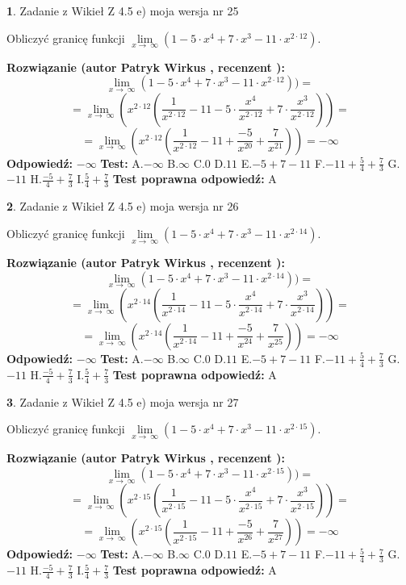 \documentclass[12pt, a4paper]{article}
\theoremstyle{definition} %
\newtheorem{zad}{}
\newcommand{\zadStart}[1]{\begin{zad}#1\newline}
\newcommand{\zadStop}{\end{zad}}
\newcommand{\rozwStart}[2]{\noindent \textbf{Rozwiązanie (autor #1 , recenzent #2): }\newline}
\newcommand{\rozwStop}{\newline}
\newcommand{\odpStart}{\noindent \textbf{Odpowiedź:}\newline}
\newcommand{\odpStop}{\newline}
\newcommand{\testStart}{\noindent \textbf{Test:}\newline}
\newcommand{\testStop}{\newline}
\newcommand{\kluczStart}{\noindent \textbf{Test poprawna odpowiedź:}\newline}
\newcommand{\kluczStop}{\newline}
\begin{document}
\zadStart{Zadanie z Wikieł Z 4.5 e) moja wersja nr 25}



Obliczyć granicę funkcji  $\lim\limits_{x\to\ \infty}(1 - 5 \cdot x^{4}+7 \cdot x^{3}- 11 \cdot x^{2\cdot12})$.
\zadStop
\rozwStart{Patryk Wirkus}{}
$$\lim\limits_{x\to\ \infty}(1 - 5 \cdot x^{4}+7 \cdot x^{3}- 11 \cdot x^{2\cdot12}))=$$
$$=\lim\limits_{x\to\ \infty}(x^{2\cdot12}(\frac{1}{x^{2\cdot12}}-11 -5 \cdot \frac{x^{4}}{x^{2\cdot12}}+7 \cdot \frac{x^{3}}{x^{2\cdot12}}))=$$
$$=\lim\limits_{x\to\ \infty}(x^{2\cdot12}(\frac{1}{x^{2\cdot12}}-11 + \frac{-5}{x^{20}}+ \frac{7}{x^{21}}))=-\infty$$
\rozwStop
\odpStart
$-\infty$
\odpStop
\testStart
A.$-\infty$ B.$\infty$ C.$0$ D.$11$ E.$-5 + 7 - 11$
F.$-11+\frac{5}{4}+\frac{7}{3}$ G.$-11$
H.$\frac{-5}{4}+\frac{7}{3}$
I.$\frac{5}{4}+\frac{7}{3}$
\testStop
\kluczStart
A
\kluczStop



\zadStart{Zadanie z Wikieł Z 4.5 e) moja wersja nr 26}



Obliczyć granicę funkcji  $\lim\limits_{x\to\ \infty}(1 - 5 \cdot x^{4}+7 \cdot x^{3}- 11 \cdot x^{2\cdot14})$.
\zadStop
\rozwStart{Patryk Wirkus}{}
$$\lim\limits_{x\to\ \infty}(1 - 5 \cdot x^{4}+7 \cdot x^{3}- 11 \cdot x^{2\cdot14}))=$$
$$=\lim\limits_{x\to\ \infty}(x^{2\cdot14}(\frac{1}{x^{2\cdot14}}-11 -5 \cdot \frac{x^{4}}{x^{2\cdot14}}+7 \cdot \frac{x^{3}}{x^{2\cdot14}}))=$$
$$=\lim\limits_{x\to\ \infty}(x^{2\cdot14}(\frac{1}{x^{2\cdot14}}-11 + \frac{-5}{x^{24}}+ \frac{7}{x^{25}}))=-\infty$$
\rozwStop
\odpStart
$-\infty$
\odpStop
\testStart
A.$-\infty$ B.$\infty$ C.$0$ D.$11$ E.$-5 + 7 - 11$
F.$-11+\frac{5}{4}+\frac{7}{3}$ G.$-11$
H.$\frac{-5}{4}+\frac{7}{3}$
I.$\frac{5}{4}+\frac{7}{3}$
\testStop
\kluczStart
A
\kluczStop



\zadStart{Zadanie z Wikieł Z 4.5 e) moja wersja nr 27}



Obliczyć granicę funkcji  $\lim\limits_{x\to\ \infty}(1 - 5 \cdot x^{4}+7 \cdot x^{3}- 11 \cdot x^{2\cdot15})$.
\zadStop
\rozwStart{Patryk Wirkus}{}
$$\lim\limits_{x\to\ \infty}(1 - 5 \cdot x^{4}+7 \cdot x^{3}- 11 \cdot x^{2\cdot15}))=$$
$$=\lim\limits_{x\to\ \infty}(x^{2\cdot15}(\frac{1}{x^{2\cdot15}}-11 -5 \cdot \frac{x^{4}}{x^{2\cdot15}}+7 \cdot \frac{x^{3}}{x^{2\cdot15}}))=$$
$$=\lim\limits_{x\to\ \infty}(x^{2\cdot15}(\frac{1}{x^{2\cdot15}}-11 + \frac{-5}{x^{26}}+ \frac{7}{x^{27}}))=-\infty$$
\rozwStop
\odpStart
$-\infty$
\odpStop
\testStart
A.$-\infty$ B.$\infty$ C.$0$ D.$11$ E.$-5 + 7 - 11$
F.$-11+\frac{5}{4}+\frac{7}{3}$ G.$-11$
H.$\frac{-5}{4}+\frac{7}{3}$
I.$\frac{5}{4}+\frac{7}{3}$
\testStop
\kluczStart
A
\kluczStop
\end{document}

